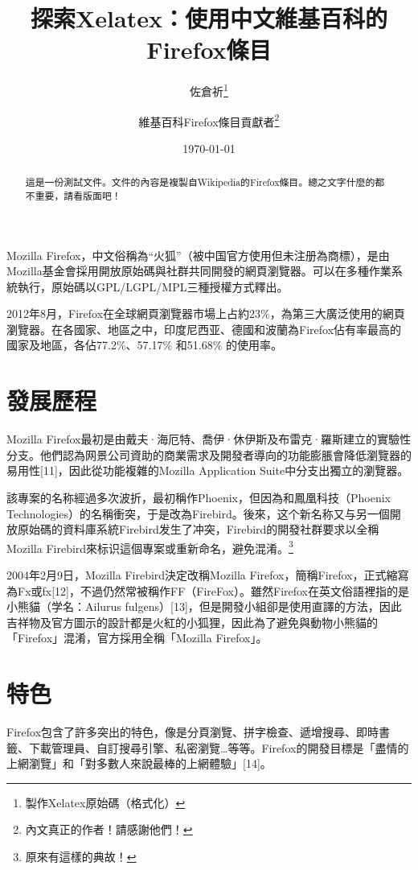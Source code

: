 \documentclass[12pt, a4paper, twoside]{article}
\begin{document}
\title{探索Xelatex：使用中文維基百科的Firefox條目}
\author{佐倉祈\thanks{製作Xelatex原始碼（格式化）}
  \and 維基百科Firefox條目貢獻者\thanks{內文真正的作者！請感謝他們！}}
\date{\today}
\maketitle

\begin{abstract}
這是一份測試文件。文件的內容是複製自Wikipedia的Firefox條目。總之文字什麼的都不重要，請看版面吧！
\end{abstract}

Mozilla Firefox，中文俗稱為“火狐”（被中国官方使用但未注册為商標），是由Mozilla基金會採用開放原始碼與社群共同開發的網頁瀏覽器。可以在多種作業系統執行，原始碼以GPL/LGPL/MPL三種授權方式釋出。

2012年8月，Firefox在全球網頁瀏覽器市場上占約23\%，為第三大廣泛使用的網頁瀏覽器。在各國家、地區之中，印度尼西亚、德國和波蘭為Firefox佔有率最高的國家及地區，各佔77.2\%、57.17\% 和51.68\% 的使用率。

\section{發展歷程}
Mozilla Firefox最初是由戴夫·海厄特、喬伊·休伊斯及布雷克·羅斯建立的實驗性分支。他們認為网景公司資助的商業需求及開發者導向的功能膨脹會降低瀏覽器的易用性[11]，因此從功能複雜的Mozilla Application Suite中分支出獨立的瀏覽器。

該專案的名称經過多次波折，最初稱作Phoenix，但因為和鳳凰科技（Phoenix Technologies）的名稱衝突，于是改為Firebird。後來，这个新名称又与另一個開放原始碼的資料庫系統Firebird发生了冲突，Firebird的開發社群要求以全稱Mozilla Firebird來标识這個專案或重新命名，避免混淆。\footnote{原來有這樣的典故！}

2004年2月9日，Mozilla Firebird決定改稱Mozilla Firefox，簡稱Firefox，正式縮寫為Fx或fx[12]，不過仍然常被稱作FF（FireFox）。雖然Firefox在英文俗語裡指的是小熊貓（学名：Ailurus fulgens）[13]，但是開發小組卻是使用直譯的方法，因此吉祥物及官方圖示的設計都是火紅的小狐狸，因此為了避免與動物小熊貓的「Firefox」混淆，官方採用全稱「Mozilla Firefox」。

\section{特色}

Firefox包含了許多突出的特色，像是分頁瀏覽、拼字檢查、遞增搜尋、即時書籤、下載管理員、自訂搜尋引擎、私密瀏覽…等等。Firefox的開發目標是「盡情的上網瀏覽」和「對多數人來說最棒的上網體驗」[14]。
\end{document}
